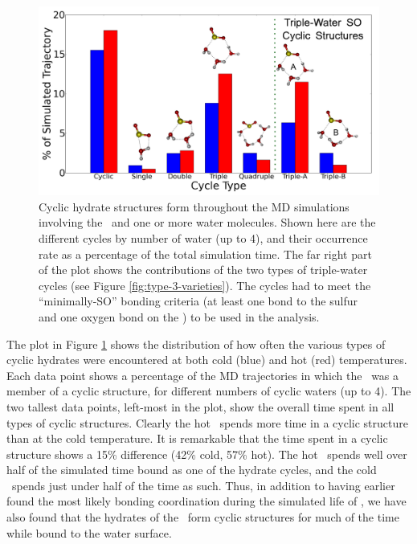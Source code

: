 \documentclass{article}
\begin{document}
\begin{figure}[h!]
	\begin{center}
		\includegraphics[scale=1.0]{cycle-distributions.png}
		\caption{Cyclic hydrate structures form throughout the MD simulations involving the \suldiox~and one or more water molecules. Shown here are the different cycles by number of water (up to 4), and their occurrence rate as a percentage of the total simulation time. The far right part of the plot shows the contributions of the two types of triple-water cycles (see Figure \ref{fig:type-3-varieties}). The cycles had to meet the ``minimally-SO'' bonding criteria (at least one bond to the sulfur and one oxygen bond on the \suldiox) to be used in the analysis.}
		\label{fig:cyclic-breakdown}
	\end{center}
\end{figure}

The plot in Figure \ref{fig:cyclic-breakdown} shows the distribution of how often the various types of cyclic hydrates were encountered at both cold (blue) and hot (red) temperatures. Each data point shows a percentage of the MD trajectories in which the \suldiox~was a member of a cyclic structure, for different numbers of cyclic waters (up to 4). The two tallest data points, left-most in the plot, show the overall time spent in all types of cyclic structures. Clearly the hot \suldiox~spends more time in a cyclic structure than at the cold temperature. It is remarkable that the time spent in a cyclic structure shows a 15\% difference (42\% cold, 57\% hot). The hot \suldiox~spends well over half of the simulated time bound as one of the hydrate cycles, and the cold \suldiox~spends just under half of the time as such. Thus, in addition to having earlier found the most likely bonding coordination during the simulated life of \suldiox, we have also found that the hydrates of the \suldiox~form cyclic structures for much of the time while bound to the water surface.
\end{document}
